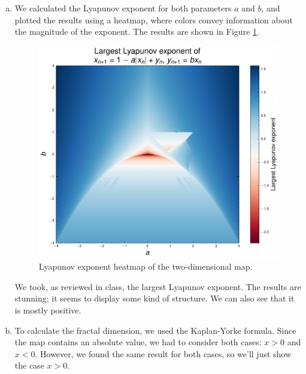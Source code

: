 \begin{enumerate}[(a)]
    \item We calculated the Lyapunov exponent for both parameters $a$ and $b$,
    and plotted the results using a heatmap, where colors convey information about the 
    magnitude of the exponent. The results are shown in Figure \ref{fig:2c}.

    \begin{figure}[!ht]
        \centering
        \includegraphics[scale=0.80]{images/lyapunov_2d.pdf}
        \caption{Lyapunov exponent heatmap of the two-dimensional map.}
        \label{fig:2c}
    \end{figure}

    We took, as reviewed in class, the largest Lyapunov exponent. The results are stunning;
    it seems to display some kind of structure. We can also see that it is mostly positive.

    \item To calculate the fractal dimension, we used the Kaplan-Yorke formula. Since the map
    contains an absolute value, we had to consider both cases: $x > 0$ and $x<0$. However, we found
    the same result for both cases, so we'll just show the case $x>0$.
    

\end{enumerate}
